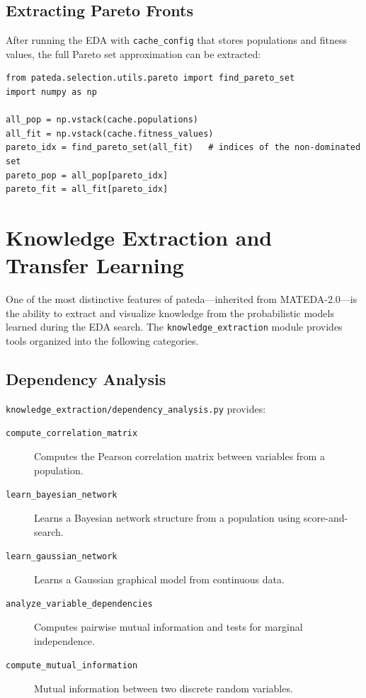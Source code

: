 \documentclass[a4paper,11pt]{article}
\begin{document}
\subsection{Extracting Pareto Fronts}

After running the EDA with \texttt{cache\_config} that stores populations and
fitness values, the full Pareto set approximation can be extracted:

\begin{lstlisting}
from pateda.selection.utils.pareto import find_pareto_set
import numpy as np

all_pop = np.vstack(cache.populations)
all_fit = np.vstack(cache.fitness_values)
pareto_idx = find_pareto_set(all_fit)   # indices of the non-dominated set
pareto_pop = all_pop[pareto_idx]
pareto_fit = all_fit[pareto_idx]
\end{lstlisting}

\section{Knowledge Extraction and Transfer Learning}
\label{sec:knowledge}

One of the most distinctive features of pateda---inherited from MATEDA-2.0---is the ability to extract and visualize knowledge from the probabilistic models learned during the EDA search.  The \texttt{knowledge\_extraction} module provides tools organized into the following categories.

\subsection{Dependency Analysis}

\texttt{knowledge\_extraction/dependency\_analysis.py} provides:

\begin{description}
  \item[\texttt{compute\_correlation\_matrix}]
    Computes the Pearson correlation matrix between variables from a population.

  \item[\texttt{learn\_bayesian\_network}]
    Learns a Bayesian network structure from a population using score-and-search.

  \item[\texttt{learn\_gaussian\_network}]
    Learns a Gaussian graphical model from continuous data.

  \item[\texttt{analyze\_variable\_dependencies}]
    Computes pairwise mutual information and tests for marginal independence.

  \item[\texttt{compute\_mutual\_information}]
    Mutual information between two discrete random variables.
\end{description}
\end{document}
